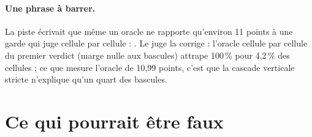 \paragraph{Une phrase à barrer.} La piste écrivait que même un oracle ne rapporte qu'environ 11 points à une garde qui juge cellule par cellule : . Le juge la corrige : l'oracle cellule par cellule du premier verdict (marge nulle aux bascules) attrape 100\,\% pour 4,2\,\% des cellules ; ce que mesure l'oracle de 10,99 points, c'est que la cascade verticale stricte n'explique qu'un quart des bascules.

\section{Ce qui pourrait être faux}\label{t3tro:sec:faux}

